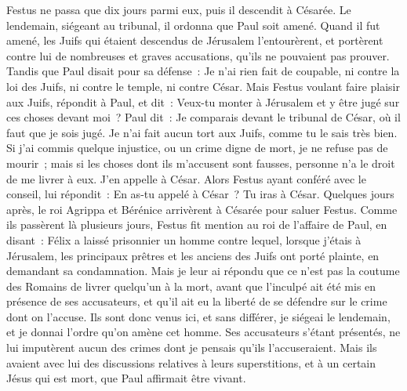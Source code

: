 \begin{multicols}{2}
Festus ne passa que dix jours parmi eux, puis il descendit à Césarée. Le lendemain, siégeant au tribunal, il ordonna que Paul soit amené.
Quand il fut amené, les Juifs qui étaient descendus de Jérusalem l'entourèrent, et portèrent contre lui de nombreuses et graves accusations, qu'ils ne pouvaient pas prouver.
Tandis que Paul disait pour sa défense~: Je n'ai rien fait de coupable, ni contre la loi des Juifs, ni contre le temple, ni contre César.
Mais Festus voulant faire plaisir aux Juifs, répondit à Paul, et dit~: Veux-tu monter à Jérusalem et y être jugé sur ces choses devant moi~?
Paul dit~: Je comparais devant le tribunal de César, où il faut que je sois jugé. Je n'ai fait aucun tort aux Juifs, comme tu le sais très bien.
Si j'ai commis quelque injustice, ou un crime digne de mort, je ne refuse pas de mourir~; mais si les choses dont ils m'accusent sont fausses, personne n'a le droit de me livrer à eux. J'en appelle à César.
Alors Festus ayant conféré avec le conseil, lui répondit~: En as-tu appelé à César~? Tu iras à César.
Quelques jours après, le roi Agrippa et Bérénice arrivèrent à Césarée pour saluer Festus.
Comme ils passèrent là plusieurs jours, Festus fit mention au roi de l'affaire de Paul, en disant~: Félix a laissé prisonnier un homme
contre lequel, lorsque j'étais à Jérusalem, les principaux prêtres et les anciens des Juifs ont porté plainte, en demandant sa condamnation.
Mais je leur ai répondu que ce n'est pas la coutume des Romains de livrer quelqu'un à la mort, avant que l'inculpé ait été mis en présence de ses accusateurs, et qu'il ait eu la liberté de se défendre sur le crime dont on l'accuse.
Ils sont donc venus ici, et sans différer, je siégeai le lendemain, et je donnai l'ordre qu'on amène cet homme.
Ses accusateurs s'étant présentés, ne lui imputèrent aucun des crimes dont je pensais qu'ils l'accuseraient.
Mais ils avaient avec lui des discussions relatives à leurs superstitions, et à un certain Jésus qui est mort, que Paul affirmait être vivant.

\end{multicols}
